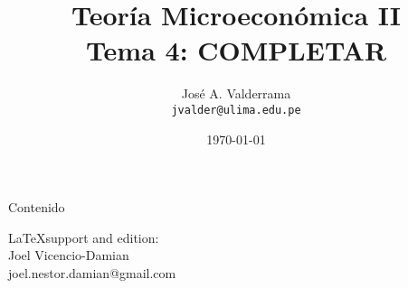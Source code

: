 \documentclass{beamer}
\title{Teoría Microeconómica II\\
		Tema 4: COMPLETAR}
\author[José A. Valderrama]{\large{José A. Valderrama}\\
		{\small \texttt{jvalder@ulima.edu.pe} {\color{black}{\faIcon{envelope}}}}}
\institute{\large Universidad de Lima - Carrera de Economía}
\date{\today}
\begin{document}
	\begin{frame}[plain]
		\maketitle
	\end{frame}
	\begin{frame}{Contenido}
		\tableofcontents
	\end{frame}

	
	
	

	\begin{frame}
		\maketitle
		{\small
			\LaTeX \enskip support and edition:\\
			Joel Vicencio-Damian\\
			\vspace{-0.05cm}
			joel.nestor.damian@gmail.com }
	\end{frame}

\end{document}
